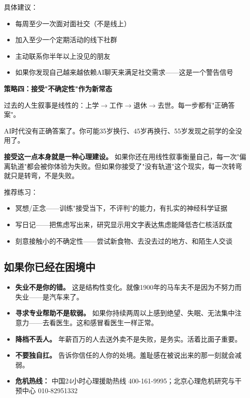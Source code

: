 \documentclass[a4paper,12pt,UTF8]{ctexart}
\begin{document}
具体建议：
\begin{itemize}
\item 每周至少一次面对面社交（不是线上）
\item 加入至少一个定期活动的线下社群
\item 主动联系你半年以上没见的朋友
\item 如果你发现自己越来越依赖AI聊天来满足社交需求——这是一个警告信号
\end{itemize}

\textbf{策略四：接受"不确定性"作为新常态}

过去的人生叙事是线性的：上学$\to$工作$\to$退休$\to$去世。每一步都有"正确答案"。

AI时代没有正确答案了。你可能35岁换行、45岁再换行、55岁发现之前学的全没用了。

\textbf{接受这一点本身就是一种心理建设。} 如果你还在用线性叙事衡量自己，每一次"偏离轨道"都会被你体验为失败。但如果你接受了"没有轨道"这个现实，每一次转弯就只是转弯，不是失败。

推荐练习：
\begin{itemize}
\item 冥想/正念——训练"接受当下，不评判"的能力，有扎实的神经科学证据
\item 写日记——把焦虑写出来，研究显示用文字表达焦虑能降低杏仁核活跃度
\item 刻意接触小的不确定性——尝试新食物、去没去过的地方、和陌生人交谈
\end{itemize}

\subsection{如果你已经在困境中}

\begin{itemize}
\item \textbf{失业不是你的错。} 这是结构性变化。就像1900年的马车夫不是因为不努力而失业——是汽车来了。
\item \textbf{寻求专业帮助不是软弱。} 如果你持续两周以上感到绝望、失眠、无法集中注意力——去看医生。这和感冒看医生一样正常。
\item \textbf{降档不丢人。} 年薪百万的人去送外卖不是失败，是务实。活着比面子重要。
\item \textbf{不要独自扛。} 告诉你信任的人你的处境。羞耻感在被说出来的那一刻就会减弱。
\item \textbf{危机热线：} 中国24小时心理援助热线 400-161-9995；北京心理危机研究与干预中心 010-82951332
\end{itemize}
\end{document}
